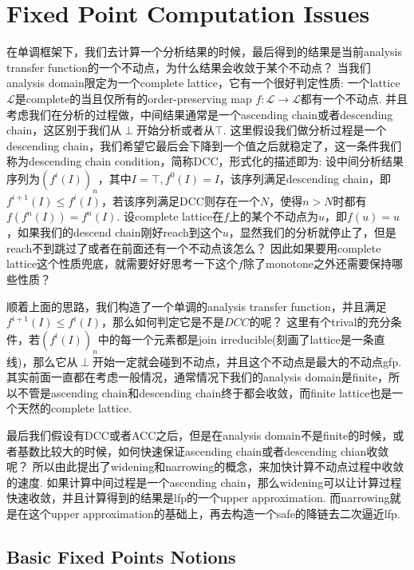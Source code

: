 \documentclass{article}
\newcommand*{\xfunc}[4]{{#2}\colon{#3}{#1}{#4}}
\newcommand*{\func}[3]{\xfunc{\to}{#1}{#2}{#3}}
\begin{document}
\newpage
\section{Fixed Point Computation Issues}

在单调框架下，我们去计算一个分析结果的时候，最后得到的结果是当前analysis transfer function的一个不动点，为什么结果会收敛于某个不动点？ 当我们analysis domain限定为一个complete lattice，它有一个很好判定性质: {\color{red}一个lattice $\mathcal{L}$是complete的当且仅所有的order-preserving map $\func{f}{\mathcal{L}}{\mathcal{L}}$都有一个不动点}. 并且考虑我们在分析的过程做，中间结果通常是一个ascending chain或者descending chain，这区别于我们从$\perp$开始分析或者从$\top$. 这里假设我们做分析过程是一个descending chain，我们希望它最后会下降到一个值之后就稳定了，这一条件我们称为descending chain condition，简称DCC，形式化的描述即为: 设中间分析结果序列为$(f^i(I))_n$，其中$I = \top,f^0(I) = I$，该序列满足descending chain，即$f^{i+1}(I) \leq f^i(I)$，若该序列满足DCC则存在一个$N$，使得$n > N$时都有$f(f^n(I)) = f^n(I)$. 设complete lattice在$f$上的某个不动点为$u$，即$f(u) = u$，如果我们的descend chain刚好reach到这个$u$，显然我们的分析就停止了，但是reach不到跳过了或者在前面还有一个不动点该怎么？ 因此如果要用complete lattice这个性质兜底，就需要好好思考一下这个$f$除了monotone之外还需要保持哪些性质？

顺着上面的思路，我们构造了一个单调的analysis transfer function，并且满足$f^{i+1}(I) \leq f^i(I)$，那么如何判定它是不是$DCC$的呢？ 这里有个trival的充分条件，若$(f^i(I))_n$中的每一个元素都是join irreducible(刻画了lattice是一条直线)，那么它从$\perp$开始一定就会碰到不动点，并且这个不动点是最大的不动点gfp. 其实前面一直都在考虑一般情况，通常情况下我们的analysis domain是finite，所以不管是ascending chain和descending chain终于都会收敛，而finite lattice也是一个天然的complete lattice. 

最后我们假设有DCC或者ACC之后，但是在analysis domain不是finite的时候，或者基数比较大的时候，如何快速保证ascending chain或者descending chian收敛呢？ {\color{red}所以由此提出了widening和narrowing的概念，来加快计算不动点过程中收敛的速度}. 如果计算中间过程是一个ascending chain，那么widening可以让计算过程快速收敛，并且计算得到的结果是lfp的一个upper approximation. 而narrowing就是在这个upper approximation的基础上，再去构造一个safe的降链去二次逼近lfp.

\newpage
\subsection{Basic Fixed Points Notions}
\end{document}
